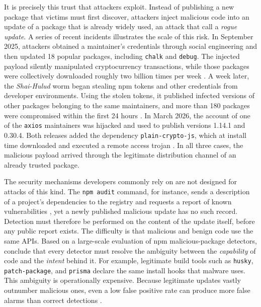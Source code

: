 \documentclass[a4paper,fleqn]{cas-dc}
\begin{document}
It is precisely this trust that attackers exploit. Instead of publishing a new package that victims must first discover, attackers inject malicious code into an update of a package that is already widely used, an attack that \citet{sofaer2024rogueone} call a \emph{rogue update}. A series of recent incidents illustrates the scale of this risk. In September 2025, attackers obtained a maintainer's credentials through social engineering and then updated 18 popular packages, including \texttt{chalk} and \texttt{debug}. The injected payload silently manipulated cryptocurrency transactions, while those packages were collectively downloaded roughly two billion times per week \citep{aws2025chalk}. A week later, the \emph{Shai-Hulud} worm began stealing npm tokens and other credentials from developer environments. Using the stolen tokens, it published infected versions of other packages belonging to the same maintainers, and more than 180 packages were compromised within the first 24 hours \citep{aws2025chalk,unit42shaihulud}. In March 2026, the account of one of the \texttt{axios} maintainers was hijacked and used to publish versions 1.14.1 and 0.30.4. Both releases added the dependency \texttt{plain-crypto-js}, which at install time downloaded and executed a remote access trojan \citep{datadog2026axios}. In all three cases, the malicious payload arrived through the legitimate distribution channel of an already trusted package.

The security mechanisms developers commonly rely on are not designed for attacks of this kind. The \texttt{npm audit} command, for instance, sends a description of a project's dependencies to the registry and requests a report of known vulnerabilities \citep{npmaudit}, yet a newly published malicious update has no such record. Detection must therefore be performed on the content of the update itself, before any public report exists. The difficulty is that malicious and benign code use the same APIs. Based on a large-scale evaluation of npm malicious-package detectors, \citet{guo2026effective} conclude that every detector must resolve the ambiguity between the \emph{capability} of code and the \emph{intent} behind it. For example, legitimate build tools such as \texttt{husky}, \texttt{patch-package}, and \texttt{prisma} declare the same install hooks that malware uses. This ambiguity is operationally expensive. Because legitimate updates vastly outnumber malicious ones, even a low false positive rate can produce more false alarms than correct detections
\citep{wyss2025evaluating}.
\end{document}
